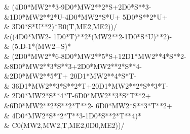 {  \multsp \multsp \multsp \multsp \multsp \&\multsp \multsp \multsp \multsp
    \multsp (4D0*MW2**3\multsp -\multsp 9D0*MW2**2*S\multsp +\multsp 2D0*S**3\multsp -\multsp  \\
  \multsp \multsp \multsp \multsp
    \multsp \&\multsp \multsp \multsp \multsp \multsp \multsp \multsp 1D0*MW2**2*U\multsp -\multsp 4D0*MW2*S*U\multsp +\multsp
    5D0*S**2*U\multsp +\multsp  \\
  \multsp \multsp \multsp \multsp \multsp \&\multsp \multsp \multsp \multsp \multsp \multsp \multsp
    3D0*S*U**2)*B0(T,ME2,ME2))/ \\
  \multsp \multsp \multsp \multsp \multsp \&\multsp \multsp \multsp ((4D0*MW2\multsp -\multsp
    1D0*T)**2*(MW2**2\multsp -\multsp 1D0*S*U)**2)\multsp -\multsp  \\
  \multsp \multsp \multsp \multsp \multsp \&\multsp \multsp
    (5.D-1*(MW2\multsp +\multsp S)* \\
  \multsp \multsp \multsp \multsp \multsp \&\multsp \multsp \multsp \multsp \multsp
    (2D0*MW2**6\multsp -\multsp 8D0*MW2**5*S\multsp +\multsp 12D1*MW2**4*S**2\multsp -\multsp  \\
  \multsp \multsp \multsp \multsp
    \multsp \&\multsp \multsp \multsp \multsp \multsp \multsp \multsp 8D0*MW2**3*S**3\multsp +\multsp 2D0*MW2**2*S**4\multsp -\multsp  \\
      \multsp \multsp \multsp \multsp \multsp \&\multsp \multsp \multsp \multsp \multsp \multsp \multsp 2D0*MW2**5*T\multsp +\multsp
    20D1*MW2**4*S*T\multsp -\multsp  \\
  \multsp \multsp \multsp \multsp \multsp \&\multsp \multsp \multsp \multsp \multsp \multsp
    \multsp 36D1*MW2**3*S**2*T\multsp +\multsp 20D1*MW2**2*S**3*T\multsp -\multsp  \\
  \multsp \multsp \multsp \multsp \multsp \&\multsp
    \multsp \multsp \multsp \multsp \multsp \multsp 2D0*MW2*S**4*T\multsp -\multsp 6D0*MW2**3*S*T**2\multsp +\multsp  \\
  \multsp \multsp
    \multsp \multsp \multsp \&\multsp \multsp \multsp \multsp \multsp \multsp \multsp 6D0*MW2**2*S**2*T**2\multsp -\multsp
    6D0*MW2*S**3*T**2\multsp +\multsp  \\
  \multsp \multsp \multsp \multsp \multsp \&\multsp \multsp \multsp \multsp \multsp \multsp
    \multsp 4D0*MW2*S**2*T**3\multsp -\multsp 1D0*S**2*T**4)* \\
  \multsp \multsp \multsp \multsp \multsp \&\multsp \multsp \multsp
    \multsp \multsp C0(MW2,MW2,T,ME2,0D0,ME2))/ \\
}
